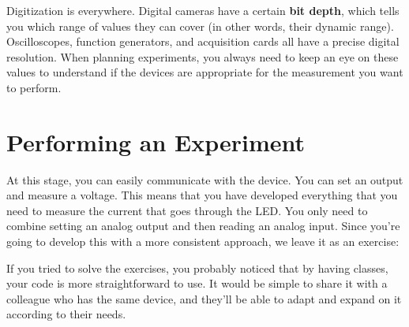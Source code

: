 Digitization is everywhere. Digital cameras have a certain \textbf{bit depth}, which tells you which range of values they can cover (in other words, their dynamic range). Oscilloscopes, function generators, and acquisition cards all have a precise digital resolution. When planning experiments, you always need to keep an eye on these values to understand if the devices are appropriate for the measurement you want to perform.


\section{Performing an Experiment}\label{sec:doing-an-experiment}
At this stage, you can easily communicate with the device. You can set an output and measure a voltage. This means that you have developed everything that you need to measure the current that goes through the LED. You only need to combine setting an analog output and then reading an analog input. Since you're going to develop this with a more consistent approach, we leave it as an exercise:




If you tried to solve the exercises, you probably noticed that by having classes, your code is more straightforward to use. It would be simple to share it with a colleague who has the same device, and they'll be able to adapt and expand on it according to their needs.

